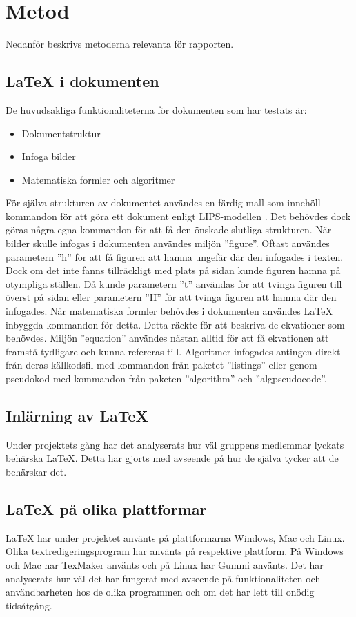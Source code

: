 \section{Metod}  
Nedanför beskrivs metoderna relevanta för rapporten.  

\subsection{{\LaTeX} i dokumenten}
De huvudsakliga funktionaliteterna för dokumenten som har testats är: 
\begin{itemize}
\item Dokumentstruktur
\item Infoga bilder
\item Matematiska formler och algoritmer
\end{itemize}   
För själva strukturen av dokumentet användes en färdig mall som innehöll kommandon för att göra ett dokument enligt LIPS-modellen \citep{lips}. Det behövdes dock göras några egna kommandon för att få den önskade slutliga strukturen. 
\newline
\newline
När bilder skulle infogas i dokumenten användes miljön ''figure''. Oftast användes parametern ''h'' för att få figuren att hamna ungefär där den infogades i texten. Dock om det inte fanns tillräckligt med plats på sidan kunde figuren hamna på otympliga ställen. Då kunde parametern ''t'' användas för att tvinga figuren till överst på sidan eller parametern ''H'' för att tvinga figuren att hamna där den infogades.
\newline
\newline
När matematiska formler behövdes i dokumenten användes {\LaTeX} inbyggda kommandon för detta. Detta räckte för att beskriva de ekvationer som behövdes. Miljön ''equation'' användes nästan alltid för att få ekvationen att framstå tydligare och kunna refereras till. Algoritmer infogades antingen direkt från deras källkodsfil med kommandon från paketet ''listings'' eller genom pseudokod med kommandon från paketen ''algorithm'' och ''algpseudocode''.  
     
\subsection{Inlärning av {\LaTeX}}
Under projektets gång har det analyserats hur väl gruppens medlemmar lyckats behärska {\LaTeX}. Detta har gjorts med avseende på hur de själva tycker att de behärskar det.      

\subsection{{\LaTeX} på olika plattformar}
{\LaTeX} har under projektet använts på plattformarna Windows, Mac och Linux. Olika textredigeringsprogram har använts på respektive plattform. På Windows och Mac har TexMaker använts och på Linux har Gummi använts. Det har analyserats hur väl det har fungerat med avseende på funktionaliteten och användbarheten hos de olika programmen och om det har lett till onödig tidsåtgång.   
